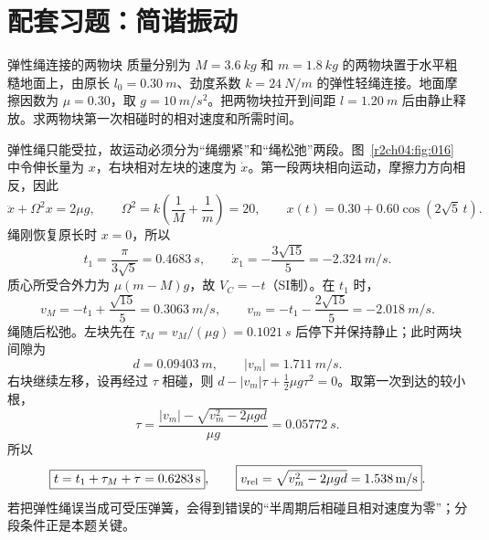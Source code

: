 \section{配套习题：简谐振动}
\label{r2ch04:sec:practice}

\begin{practicebox}{弹性绳连接的两物块}
质量分别为 $M=\SI{3.6}{kg}$ 和 $m=\SI{1.8}{kg}$ 的两物块置于水平粗糙地面上，由原长 $l_0=\SI{0.30}{m}$、劲度系数 $k=\SI{24}{N/m}$ 的弹性轻绳连接。地面摩擦因数为 $\mu=0.30$，取 $g=\SI{10}{m/s^2}$。把两物块拉开到间距 $l=\SI{1.20}{m}$ 后由静止释放。求两物块第一次相碰时的相对速度和所需时间。
\label{r2ch04:pr:001}
\begin{solution}
弹性绳只能受拉，故运动必须分为“绳绷紧”和“绳松弛”两段。图~\ref{r2ch04:fig:016} 中令伸长量为 $x$，右块相对左块的速度为 $\dot x$。第一段两块相向运动，摩擦力方向相反，因此
\begin{equation}
 \ddot x+\Omega^2x=2\mu g,\qquad
 \Omega^2=k\left(\frac1M+\frac1m\right)=20,\qquad
 x(t)=0.30+0.60\cos(2\sqrt5\,t).
 \label{r2ch04:eq:039}
\end{equation}
绳刚恢复原长时 $x=0$，所以
\[
 t_1=\frac{\pi}{3\sqrt5}=\SI{0.4683}{s},\qquad
 \dot x_1=-\frac{3\sqrt{15}}5=\SI{-2.324}{m/s}.
\]
质心所受合外力为 $\mu(m-M)g$，故 $V_C=-t$（SI制）。在 $t_1$ 时，
\[
 v_M=-t_1+\frac{\sqrt{15}}5=\SI{0.3063}{m/s},\qquad
 v_m=-t_1-\frac{2\sqrt{15}}5=\SI{-2.018}{m/s}.
\]
绳随后松弛。左块先在 $\tau_M=v_M/(\mu g)=\SI{0.1021}{s}$ 后停下并保持静止；此时两块间隙为
\[
 d=\SI{0.09403}{m},\qquad |v_m|=\SI{1.711}{m/s}.
\]
右块继续左移，设再经过 $\tau$ 相碰，则 $d-|v_m|\tau+\tfrac12\mu g\tau^2=0$。取第一次到达的较小根，
\[
 \tau=\frac{|v_m|-\sqrt{v_m^2-2\mu gd}}{\mu g}=\SI{0.05772}{s}.
\]
所以
\[
 \boxed{t=t_1+\tau_M+\tau=\SI{0.6283}{s}},\qquad
 \boxed{v_{\rm rel}=\sqrt{v_m^2-2\mu gd}=\SI{1.538}{m/s}}.
\]
若把弹性绳误当成可受压弹簧，会得到错误的“半周期后相碰且相对速度为零”；分段条件正是本题关键。
\figElasticRopeBlocks
\end{solution}
\end{practicebox}

